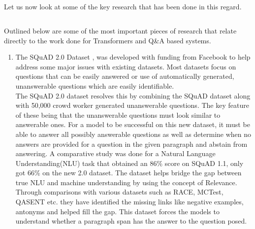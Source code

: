 \documentclass[12pt]{report}
\begin{document}
    Let us now look at some of the key research that has been done in this regard.

    \subsection{}\label{rr}
    Outlined below are some of the most important pieces of research that relate directly to the work done for Transformers and Q\&A based systems.
    \begin{enumerate}
        \item The SQuAD 2.0 Dataset \citep{dataset}, was developed with funding from Facebook to help address some major issues with existing datasets. Most datasets focus on questions that can be easily answered or use of automatically generated, unanswerable questions which are easily identifiable.\\
        The SQuAD 2.0 dataset resolves this by combining the SQuAD dataset along with 50,000 crowd worker generated unanswerable questions. The key feature of these being that the unanswerable questions must look similar to answerable ones. For a model to be successful on this new dataset, it must be able to answer all possibly answerable questions as well as determine when no answers are provided for a question in the given paragraph and abstain from answering. A comparative study was done for a Natural Language Understanding(NLU) task that obtained an 86\% score on SQuAD 1.1, only got 66\% on the new 2.0 dataset.
        The dataset helps bridge the gap between true NLU and machine understanding by using the concept of Relevance. Through comparisons with various datasets such as RACE, MCTest, QASENT etc. they have identified the missing links like negative examples, antonyms and helped fill the gap. This dataset forces the models to understand whether a paragraph span has the answer to the question posed.


\end{enumerate}
\end{document}
